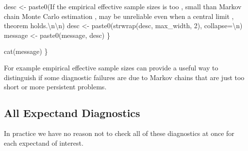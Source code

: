 \documentclass[
  letterpaper,
  DIV=11,
  numbers=noendperiod]{scrartcl}
\newenvironment{Shaded}{\begin{snugshade}}{\end{snugshade}}
\newcommand{\AttributeTok}[1]{\textcolor[rgb]{0.40,0.45,0.13}{#1}}
\newcommand{\DecValTok}[1]{\textcolor[rgb]{0.68,0.00,0.00}{#1}}
\newcommand{\FunctionTok}[1]{\textcolor[rgb]{0.28,0.35,0.67}{#1}}
\newcommand{\NormalTok}[1]{\textcolor[rgb]{0.00,0.23,0.31}{#1}}
\newcommand{\OtherTok}[1]{\textcolor[rgb]{0.00,0.23,0.31}{#1}}
\newcommand{\SpecialCharTok}[1]{\textcolor[rgb]{0.37,0.37,0.37}{#1}}
\newcommand{\StringTok}[1]{\textcolor[rgb]{0.13,0.47,0.30}{#1}}
\begin{document}
\begin{Shaded}
\begin{Highlighting}[]
\NormalTok{    desc }\OtherTok{\textless{}{-}} \FunctionTok{paste0}\NormalTok{(}\StringTok{\textquotesingle{}If the empirical effective sample sizes is too \textquotesingle{}}\NormalTok{,}
                   \StringTok{\textquotesingle{}small than Markov chain Monte Carlo estimation \textquotesingle{}}\NormalTok{,}
                   \StringTok{\textquotesingle{}may be unreliable even when a central limit \textquotesingle{}}\NormalTok{,}
                   \StringTok{\textquotesingle{}theorem holds.}\SpecialCharTok{\textbackslash{}n\textbackslash{}n}\StringTok{\textquotesingle{}}\NormalTok{)}
\NormalTok{    desc }\OtherTok{\textless{}{-}} \FunctionTok{paste0}\NormalTok{(}\FunctionTok{strwrap}\NormalTok{(desc, max\_width, }\DecValTok{2}\NormalTok{), }\AttributeTok{collapse=}\StringTok{\textquotesingle{}}\SpecialCharTok{\textbackslash{}n}\StringTok{\textquotesingle{}}\NormalTok{)}
\NormalTok{    message }\OtherTok{\textless{}{-}} \FunctionTok{paste0}\NormalTok{(message, desc)}
\NormalTok{  \}}
  
  \FunctionTok{cat}\NormalTok{(message)}
\NormalTok{\}}
\end{Highlighting}
\end{Shaded}

For example empirical effective sample sizes can provide a useful way to
distinguish if some diagnostic failures are due to Markov chains that
are just too short or more persistent problems.

\hypertarget{all-expectand-diagnostics}{%
\subsection{All Expectand Diagnostics}\label{all-expectand-diagnostics}}

In practice we have no reason not to check all of these diagnostics at
once for each expectand of interest.
\end{document}
